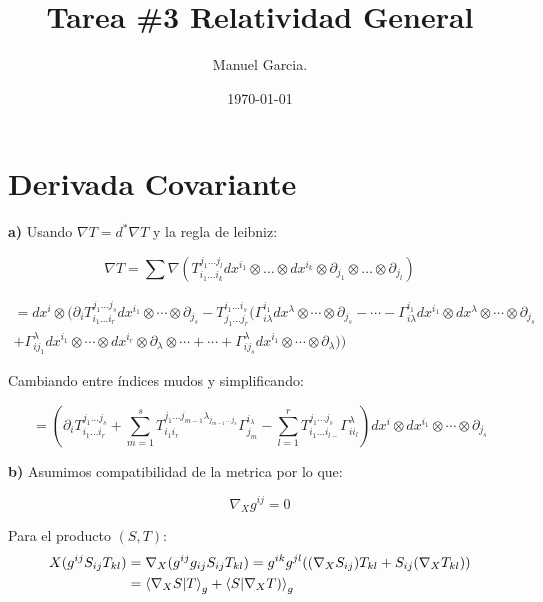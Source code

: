\documentclass{article}
\title{Tarea \#3 Relatividad General}
\author{Manuel Garcia.}
\date{\today}
\begin{document}
\maketitle






\section{Derivada Covariante}
\textbf{a) } Usando $\nabla T = d^{\ast} \nabla T$ y la regla de leibniz:

\[
\nabla T = \sum \nabla (T_{i_1 \ldots i_k}^{j_1 \ldots j_l} dx^{i_1} \otimes \ldots \otimes dx^{i_k} \otimes \partial_{j_1} \otimes \ldots \otimes \partial_{j_l})
\]

\begin{gather*}
  =dx^i \otimes (\partial_i T _{i_1...i_r } ^ {j_1...j_s}dx ^ {i_1 }\otimes \cdots \otimes \partial _{j_s } - T _{j_1...j_r } ^ {i_1...i_s}(\Gamma _{i\lambda}^{i_1} dx^\lambda \otimes \cdots \otimes \partial_{j_s} - \cdots - \Gamma _{i\lambda}^{i_1}dx^{i_1} \otimes dx^\lambda\otimes \cdots \otimes \partial _{j_s } \\+ \Gamma _{ij_1}^\lambda dx^{i_1} \otimes \cdots \otimes dx^{i_r}\otimes \partial_\lambda \otimes \cdots + \cdots + \Gamma _{ij_s}^\lambda dx^{i_1}\otimes \cdots \otimes \partial_\lambda))
\end{gather*}

Cambiando entre índices mudos y simplificando:

\[
  = \left( \partial _{i } T_{i_1 \ldots i_r}^{j_1 \ldots j_s} + \sum_{m=1}^s T_{i_1 i_r}^{j_1... j_{m-1}\lambda_{j_{m-1}...j_s}} \Gamma_{j_m}^{i_\lambda} - \sum_{l=1}^r T_{i_1...i_{l-}}^{j_1...j_s} \Gamma_{ii_l}^\lambda \right) dx^i\otimes dx^{i_1}\otimes\cdots\otimes\partial_{j_s}
\]



\textbf{b) } Asumimos compatibilidad de la metrica por lo que:

\[
\nabla_{X} g^{ij} = 0
\]

Para el producto $(S, T)$:
\begin{align*}
  X (g^{ij} S_{ij} T_{kl}) &= \nabla_{X} (g^{ij} g_{ij} S_{ij} T_{kl}) = g^{ik}g^{jl} ((\nabla_{X} S_{ij}) T_{kl} + S_{ij} (\nabla_{X} T_{kl}))\\
                           &= \bra{\nabla_{X} S}\ket{ T}_{g} + \bra{S}\ket{ \nabla_{X} T)}_{g}
\end{align*}
\end{document}
